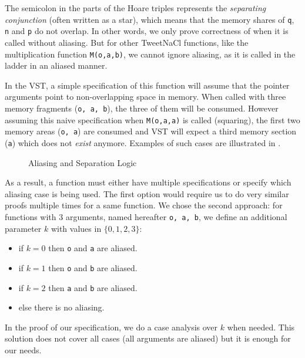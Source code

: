 
The semicolon in the  parts of the Hoare triples represents the \emph{separating conjunction} (often written as a star), which means that
the memory shares of \texttt{q}, \texttt{n} and \texttt{p} do not overlap.
In other words,
we only prove correctness of  when it is called without aliasing.
But for other TweetNaCl functions, like the multiplication function \texttt{M(o,a,b)}, we cannot ignore aliasing, as it is called in the ladder in an aliased manner.

In the VST, a simple specification of this function will assume that the pointer arguments
point to non-overlapping space in memory.
When called with three memory fragments (\texttt{o, a, b}),
the three of them will be consumed. However assuming this naive specification
when \texttt{M(o,a,a)} is called (squaring), the first two memory areas (\texttt{o, a})
are consumed and VST will expect a third memory section (\texttt{a}) which does not \emph{exist} anymore.
Examples of such cases are illustrated in .
\begin{figure}[h]%
  \centering%
  \caption{Aliasing and Separation Logic}%
  \label{tikz:MemSame}%
\end{figure}

As a result, a function must either have multiple specifications or specify which
aliasing case is being used.
The first option would require us to do very similar proofs multiple times for a same function.
We chose the second approach: for functions with 3 arguments, named hereafter \texttt{o, a, b},
we define an additional parameter $k$ with values in $\{0,1,2,3\}$:
\begin{itemize}
  \item if $k=0$ then \texttt{o} and \texttt{a} are aliased.
  \item if $k=1$ then \texttt{o} and \texttt{b} are aliased.
  \item if $k=2$ then \texttt{a} and \texttt{b} are aliased.
  \item else there is no aliasing.
\end{itemize}
In the proof of our specification, we do a case analysis over $k$ when needed.
This solution does not cover all cases (\eg all arguments are aliased) but it
is enough for our needs.





